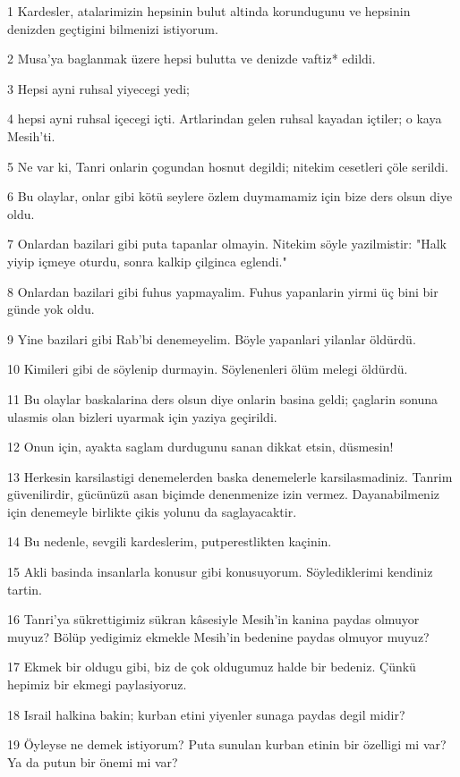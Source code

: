 \par 1 Kardesler, atalarimizin hepsinin bulut altinda korundugunu ve hepsinin denizden geçtigini bilmenizi istiyorum.
\par 2 Musa'ya baglanmak üzere hepsi bulutta ve denizde vaftiz* edildi.
\par 3 Hepsi ayni ruhsal yiyecegi yedi;
\par 4 hepsi ayni ruhsal içecegi içti. Artlarindan gelen ruhsal kayadan içtiler; o kaya Mesih'ti.
\par 5 Ne var ki, Tanri onlarin çogundan hosnut degildi; nitekim cesetleri çöle serildi.
\par 6 Bu olaylar, onlar gibi kötü seylere özlem duymamamiz için bize ders olsun diye oldu.
\par 7 Onlardan bazilari gibi puta tapanlar olmayin. Nitekim söyle yazilmistir: "Halk yiyip içmeye oturdu, sonra kalkip çilginca eglendi."
\par 8 Onlardan bazilari gibi fuhus yapmayalim. Fuhus yapanlarin yirmi üç bini bir günde yok oldu.
\par 9 Yine bazilari gibi Rab'bi denemeyelim. Böyle yapanlari yilanlar öldürdü.
\par 10 Kimileri gibi de söylenip durmayin. Söylenenleri ölüm melegi öldürdü.
\par 11 Bu olaylar baskalarina ders olsun diye onlarin basina geldi; çaglarin sonuna ulasmis olan bizleri uyarmak için yaziya geçirildi.
\par 12 Onun için, ayakta saglam durdugunu sanan dikkat etsin, düsmesin!
\par 13 Herkesin karsilastigi denemelerden baska denemelerle karsilasmadiniz. Tanrim güvenilirdir, gücünüzü asan biçimde denenmenize izin vermez. Dayanabilmeniz için denemeyle birlikte çikis yolunu da saglayacaktir.
\par 14 Bu nedenle, sevgili kardeslerim, putperestlikten kaçinin.
\par 15 Akli basinda insanlarla konusur gibi konusuyorum. Söylediklerimi kendiniz tartin.
\par 16 Tanri'ya sükrettigimiz sükran kâsesiyle Mesih'in kanina paydas olmuyor muyuz? Bölüp yedigimiz ekmekle Mesih'in bedenine paydas olmuyor muyuz?
\par 17 Ekmek bir oldugu gibi, biz de çok oldugumuz halde bir bedeniz. Çünkü hepimiz bir ekmegi paylasiyoruz.
\par 18 Israil halkina bakin; kurban etini yiyenler sunaga paydas degil midir?
\par 19 Öyleyse ne demek istiyorum? Puta sunulan kurban etinin bir özelligi mi var? Ya da putun bir önemi mi var?
